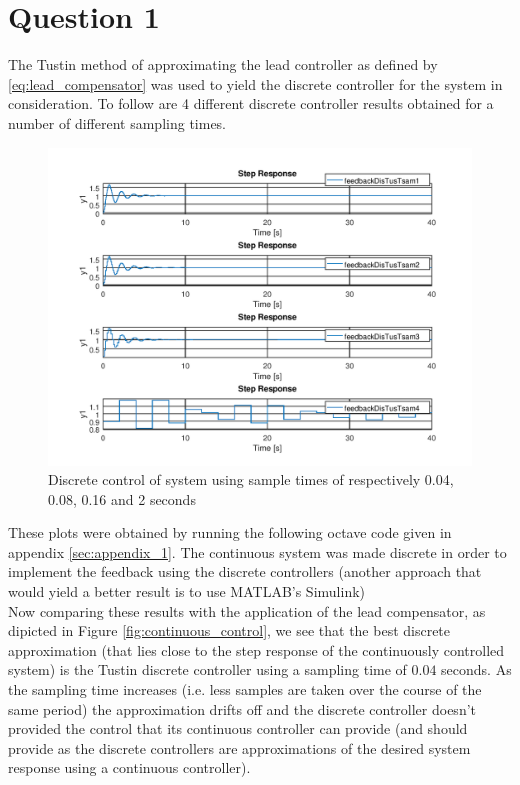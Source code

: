 \documentclass[a4paper, 12pt]{article}
\begin{document}
\section{Question 1} %
\label{sec:question_1}
The Tustin method of approximating the lead controller as defined by \eqref{eq:lead_compensator} was used to yield the discrete controller for the system in consideration. To follow are 4 different discrete controller results obtained for a number of different sampling times.

\begin{figure}[H]
  \centering
  \includegraphics[width=\textwidth]{img/discrete_controllers.png}
  \caption{Discrete control of system using sample times of respectively 0.04, 0.08, 0.16 and 2 seconds}
  \label{fig:discrete_controllers}
\end{figure}

These plots were obtained by running the following octave code given in
appendix \ref{sec:appendix_1}. The continuous system was made discrete in order
to implement the feedback using the discrete controllers (another approach that
would yield a better result is to use MATLAB's Simulink)\\

Now comparing these results with the application of the lead compensator, as
dipicted in Figure \ref{fig:continuous_control}, we see that the best discrete
approximation (that lies close to the step response of the continuously
controlled system) is the Tustin discrete controller using a sampling time of
$0.04$ seconds. As the sampling time increases (i.e. less samples are taken
over the course of the same period) the approximation drifts off and the
discrete controller doesn't provided the control that its continuous controller
can provide (and should provide as the discrete controllers are approximations
of the desired system response using a continuous controller).\\
\end{document}
